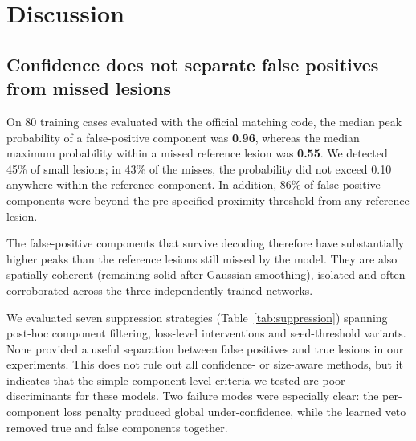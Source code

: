 \documentclass[runningheads]{llncs}
\begin{document}
\section{Discussion}
\label{sec:discussion}

\subsection{Confidence does not separate false positives from missed lesions}
\label{sec:fp}

On 80 training cases evaluated with the official matching code, the median peak probability of a
false-positive component was \textbf{0.96}, whereas the median maximum probability within a missed
reference lesion was \textbf{0.55}. We detected 45\% of small lesions; in 43\% of the misses, the
probability did not exceed 0.10 anywhere within the reference component. In addition, 86\% of
false-positive components were beyond the pre-specified proximity threshold from any reference
lesion.

The false-positive components that survive decoding therefore have substantially higher peaks
than the reference lesions still missed by the model. They are also spatially coherent (remaining
solid after Gaussian smoothing), isolated and often corroborated across the three independently
trained networks.

We evaluated seven suppression strategies (Table~\ref{tab:suppression}) spanning post-hoc
component filtering, loss-level interventions and seed-threshold variants. None provided a useful
separation between false positives and true lesions in our experiments. This does not rule out all
confidence- or size-aware methods, but it indicates that the simple component-level criteria we
tested are poor discriminants for these models. Two failure modes were especially clear: the
per-component loss penalty produced global under-confidence, while the learned veto removed true
and false components together.
\end{document}
